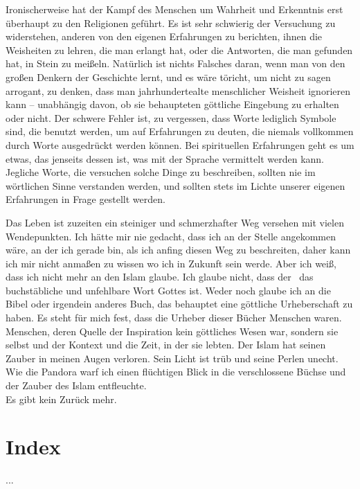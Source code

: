 \documentclass[12pt]{memoir}
\begin{document}
Ironischerweise hat der Kampf des Menschen um Wahrheit und Erkenntnis
erst überhaupt zu den Religionen geführt.
Es ist sehr schwierig der Versuchung zu widerstehen,
anderen von den eigenen Erfahrungen zu berichten,
ihnen die Weisheiten zu lehren, die man erlangt hat,
oder die Antworten, die man gefunden hat, in Stein zu meißeln.
Natürlich ist nichts Falsches daran,
wenn man von den großen Denkern der Geschichte lernt,
und es wäre töricht, um nicht zu sagen arrogant, zu denken,
dass man jahrhundertealte menschlicher Weisheit ignorieren kann –
unabhängig davon, ob sie behaupteten
göttliche Eingebung zu erhalten oder nicht.
Der schwere Fehler ist, zu vergessen, dass Worte lediglich Symbole sind,
die benutzt werden, um auf Erfahrungen zu deuten,
die niemals vollkommen durch Worte ausgedrückt werden können.
Bei spirituellen Erfahrungen geht es um etwas,
das jenseits dessen ist, was mit der Sprache vermittelt werden kann.
Jegliche Worte, die versuchen solche Dinge zu beschreiben,
sollten nie im wörtlichen Sinne verstanden werden,
und sollten stets im Lichte unserer eigenen Erfahrungen
in Frage gestellt werden.

Das Leben ist zuzeiten ein steiniger und schmerzhafter Weg
versehen mit vielen Wendepunkten.
Ich hätte mir nie gedacht,
dass ich an der Stelle angekommen wäre, an der ich gerade bin,
als ich anfing diesen Weg zu beschreiten,
daher kann ich mir nicht anmaßen zu wissen wo ich in Zukunft sein werde.
Aber ich weiß, dass ich nicht mehr an den Islam glaube.
Ich glaube nicht, dass der \Quran\
das buchstäbliche und unfehlbare Wort Gottes ist.
Weder noch glaube ich an die Bibel oder irgendein anderes Buch,
das behauptet eine göttliche Urheberschaft zu haben.
Es steht für mich fest, dass die Urheber dieser Bücher Menschen waren.
Menschen, deren Quelle der Inspiration kein göttliches Wesen war,
sondern sie selbst und der Kontext und die Zeit, in der sie lebten.
Der Islam hat seinen Zauber in meinen Augen verloren.
Sein Licht ist trüb und seine Perlen unecht.
Wie die Pandora warf ich einen flüchtigen Blick in die verschlossene Büchse
und der Zauber des Islam entfleuchte.\\
Es gibt kein Zurück mehr.


\backmatter

\chapter{Index}
...
\end{document}

